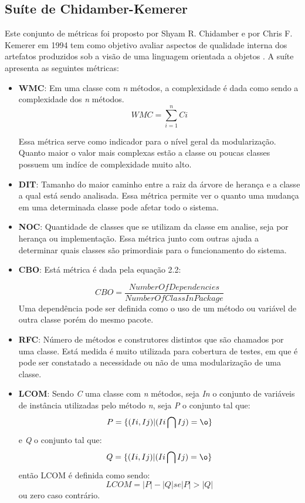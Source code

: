 \subsection{Suíte de Chidamber-Kemerer}
Este conjunto de métricas foi proposto por Shyam R. Chidamber e por Chris F. Kemerer em 1994 tem como objetivo avaliar aspectos de qualidade interna dos artefatos produzidos sob a visão de uma linguagem orientada a objetos \cite{chidamber}. A suíte apresenta as seguintes métricas:
\begin{itemize}

\item \textbf{WMC}: Em uma classe com \textit{n} métodos, a complexidade é dada como sendo a complexidade dos \textit{n} métodos. 
 \begin{equation}
WMC = \sum_{i=1}^{n}Ci
\end{equation}


Essa métrica serve como indicador para o nível geral da modularização. Quanto maior o valor mais complexas estão a classe ou poucas classes possuem um indíce de complexidade muito alto.

\item \textbf{DIT}: Tamanho do maior caminho entre a raiz da árvore de herança e a classe a qual está sendo analisada. Essa métrica permite ver o quanto uma mudança em uma determinada classe pode afetar todo o sistema.

\item \textbf{NOC}: Quantidade de classes que se utilizam da classe em analise, seja por herança ou implementação. Essa métrica junto com outras ajuda a determinar quais classes são primordiais para o funcionamento do sistema.

\item \textbf{CBO}: Está métrica é dada pela equação 2.2: 

\begin{equation}
CBO = \frac{NumberOfDependencies}{NumberOfClassInPackage}
\end{equation}
Uma dependência pode ser definida como o uso de um método ou variável de outra classe porém do mesmo pacote.

\item \textbf{RFC}: Número de métodos e construtores distintos que são chamados por uma classe. Está medida é muito utilizada para cobertura de testes, em que é pode ser constatado a necessidade ou não de uma modularização de uma classe.

\item \textbf{LCOM}: Sendo \textit{C} uma classe com \textit{n} métodos, seja \textit{In} o conjunto de variáveis de instância utilizadas pelo método \textit{n}, seja \textit{P} o conjunto tal que:
\begin{equation}
P = \{(Ii,Ij)|(Ii\bigcap Ij)= \o\}
\end{equation}
e \textit{Q} o conjunto tal que:
\begin{equation}
Q = \{(Ii,Ij)|(Ii\bigcap Ij)= \o\}
\end{equation}
então LCOM é definida como sendo:
\begin{equation}
LCOM = |P| - |Q| se |P|>|Q|
\end{equation}
ou zero caso contrário.
\end{itemize}


